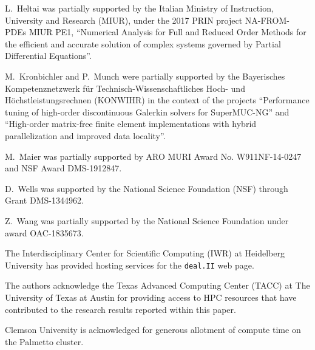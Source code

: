 \documentclass{ansarticle-preprint}
\newcommand{\specialword}[1]{\texttt{#1}}
\newcommand{\dealii}{{\specialword{deal.II}}\xspace}
\begin{document}
L.~Heltai was partially supported by the Italian Ministry of Instruction,
University and Research (MIUR), under the 2017 PRIN project NA-FROM-PDEs MIUR
PE1, ``Numerical Analysis for Full and Reduced Order Methods for the efficient
and accurate solution of complex systems governed by Partial Differential
Equations''.

M.~Kronbichler and P.~Munch were partially supported by the
Bayerisches Kompetenznetzwerk
f\"ur Technisch-Wissen\-schaft\-li\-ches Hoch- und H\"ochstleistungsrechnen
(KONWIHR) in the context of the projects
``Performance tuning of high-order discontinuous Galerkin solvers for
SuperMUC-NG'' and ``High-order matrix-free finite element implementations with
hybrid parallelization and improved data locality''.

M.~Maier was partially supported by ARO MURI Award No. W911NF-14-0247 and
NSF Award DMS-1912847.

D.~Wells was supported by the National Science Foundation (NSF) through Grant
DMS-1344962.

Z.~Wang was partially
supported by the National Science Foundation under award OAC-1835673.

The Interdisciplinary Center for Scientific Computing (IWR) at Heidelberg
University has provided hosting services for the \dealii{} web page.


The authors acknowledge the Texas Advanced Computing Center (TACC) at The
University of Texas at Austin for providing access to HPC resources that have
contributed to the research results reported within this paper.

Clemson University is acknowledged for generous allotment of compute time on
the Palmetto cluster.


{}

\end{document}
